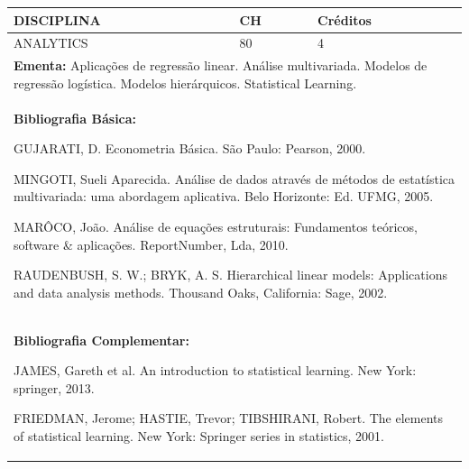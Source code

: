 \documentclass[a4paper, 12pt, openright, oneside, german, french, english, brazil]{abntex2}
\begin{document}
\begin{table}[!h]
  \footnotesize
  \centering
  \begin{tabular}{|p{100mm}|p{10mm}|p{20mm}|}
    \hline
    \textbf{DISCIPLINA} & \textbf{CH} & \textbf{Créditos} \\
    \hline
    ANALYTICS  & 80 & 4 \\
    \hline
    \multicolumn{3}{|p{130mm}|}{\textbf{Ementa:} Aplicações de regressão linear. Análise multivariada. Modelos de regressão logística. Modelos hierárquicos. Statistical Learning. } \\
    \hline
    \multicolumn{3}{|p{130mm}|}{\textbf{Bibliografia Básica:}

    GUJARATI, D. Econometria Básica. São Paulo: Pearson, 2000.

MINGOTI, Sueli Aparecida. Análise de dados através de métodos de estatística multivariada: uma abordagem aplicativa. Belo Horizonte: Ed. UFMG, 2005.

MARÔCO, João. Análise de equações estruturais: Fundamentos teóricos, software \& aplicações. ReportNumber, Lda, 2010.

RAUDENBUSH, S. W.; BRYK, A. S. Hierarchical linear models: Applications and data analysis methods. Thousand Oaks, California: Sage, 2002.
} \\
    \hline
    \multicolumn{3}{|p{130mm}|}{\textbf{Bibliografia Complementar:}

    JAMES, Gareth et al. An introduction to statistical learning. New York: springer, 2013.

FRIEDMAN, Jerome; HASTIE, Trevor; TIBSHIRANI, Robert. The elements of statistical learning. New York: Springer series in statistics, 2001.
} \\
    \hline
  \end{tabular}
\end{table}
\end{document}

